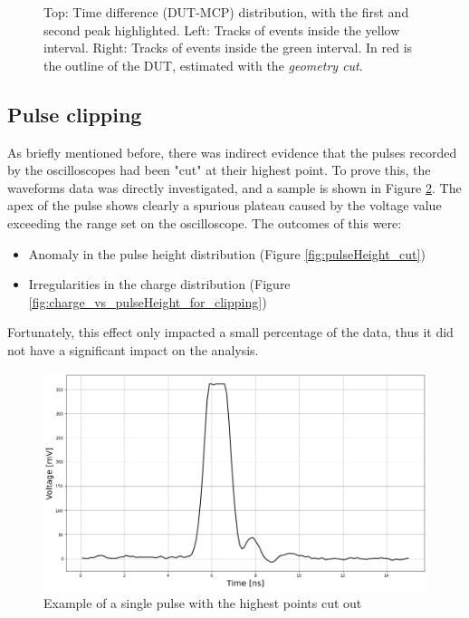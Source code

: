 \begin{figure}[h!tbp]
    \captionsetup{width=\captionwidth}
    \caption{Top: Time difference (DUT-MCP) distribution, with the first and second peak highlighted.
    Left: Tracks of events inside the yellow interval. Right: Tracks of events inside the green interval. In red is the outline of the DUT, estimated with the \textit{geometry cut}.}
    \label{fig:time_difference_multiple_peaks_highlight}
\end{figure}

\FloatBarrier

\subsection{Pulse clipping}\label{sec:pulse_clipping}

As briefly mentioned before, there was indirect evidence that the pulses recorded by the oscilloscopes had been "cut" at their highest point. To prove this, the waveforms data was directly investigated, and a sample is shown in Figure \ref{fig:clipped_pulse}. The apex of the pulse shows clearly a spurious plateau caused by the voltage value exceeding the range set on the oscilloscope. The outcomes of this were:

\begin{itemize}
    \item Anomaly in the pulse height distribution (Figure \ref{fig:pulseHeight_cut})
    \item Irregularities in the charge distribution (Figure \ref{fig:charge_vs_pulseHeight_for_clipping})
\end{itemize}

Fortunately, this effect only impacted a small percentage of the data, thus it did not have a significant impact on the analysis.

\begin{figure}[h!tbp]
    \centering
    \includegraphics[width=.9\linewidth]{Images/detailed_analysis/Waveform of clipped pulse (ns).png}
    \captionsetup{width=\captionwidth}
    \caption{Example of a single pulse with the highest points cut out}
    \label{fig:clipped_pulse}
\end{figure}
 

